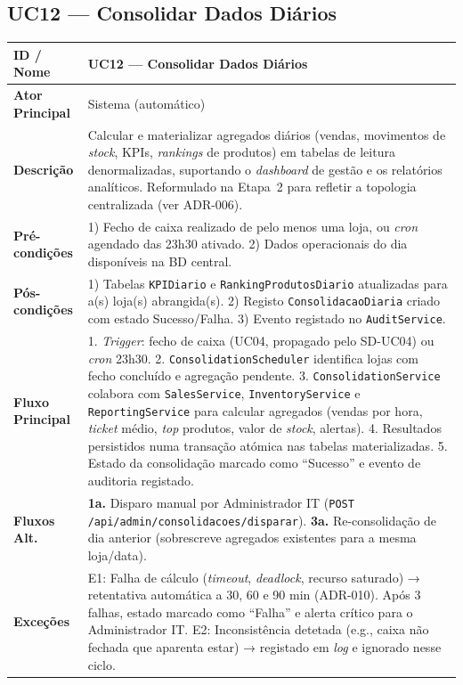 \documentclass[a4paper,12pt]{scrreprt}
\begin{document}
\subsection*{UC12 --- Consolidar Dados Diários}
\begin{table}[H]
\centering\small
\begin{tabular}{|p{3cm}|p{11cm}|}
\hline
\textbf{ID / Nome} & UC12 --- Consolidar Dados Diários \\
\hline
\textbf{Ator Principal} & Sistema (automático) \\
\hline
\textbf{Descrição} & Calcular e materializar agregados diários (vendas, movimentos de \textit{stock}, KPIs, \textit{rankings} de produtos) em tabelas de leitura denormalizadas, suportando o \textit{dashboard} de gestão e os relatórios analíticos. Reformulado na Etapa~2 para refletir a topologia centralizada (ver ADR-006). \\
\hline
\textbf{Pré-condições} & 1) Fecho de caixa realizado de pelo menos uma loja, ou \textit{cron} agendado das 23h30 ativado. 2) Dados operacionais do dia disponíveis na BD central. \\
\hline
\textbf{Pós-condições} & 1) Tabelas \texttt{KPIDiario} e \texttt{RankingProdutosDiario} atualizadas para a(s) loja(s) abrangida(s). 2) Registo \texttt{ConsolidacaoDiaria} criado com estado Sucesso/Falha. 3) Evento registado no \texttt{AuditService}. \\
\hline
\textbf{Fluxo Principal} & 1. \textit{Trigger}: fecho de caixa (UC04, propagado pelo SD-UC04) ou \textit{cron} 23h30. 2. \texttt{ConsolidationScheduler} identifica lojas com fecho concluído e agregação pendente. 3. \texttt{ConsolidationService} colabora com \texttt{SalesService}, \texttt{InventoryService} e \texttt{ReportingService} para calcular agregados (vendas por hora, \textit{ticket} médio, \textit{top} produtos, valor de \textit{stock}, alertas). 4. Resultados persistidos numa transação atómica nas tabelas materializadas. 5. Estado da consolidação marcado como ``Sucesso'' e evento de auditoria registado. \\
\hline
\textbf{Fluxos Alt.} & \textbf{1a.} Disparo manual por Administrador IT (\texttt{POST /api/admin/consolidacoes/disparar}). \textbf{3a.} Re-consolidação de dia anterior (sobrescreve agregados existentes para a mesma loja/data). \\
\hline
\textbf{Exceções} & E1: Falha de cálculo (\textit{timeout}, \textit{deadlock}, recurso saturado) → retentativa automática a 30, 60 e 90 min (ADR-010). Após 3 falhas, estado marcado como ``Falha'' e alerta crítico para o Administrador IT. E2: Inconsistência detetada (e.g., caixa não fechada que aparenta estar) → registado em \textit{log} e ignorado nesse ciclo. \\

\end{tabular}
\end{table}
\end{document}
